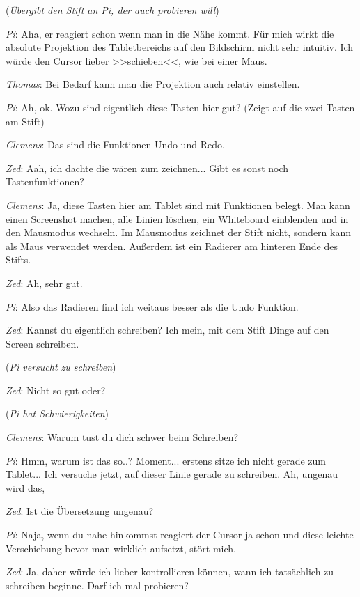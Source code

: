 \medskip (\emph{Übergibt den Stift an Pi, der auch probieren will})

\medskip \emph{Pi}: Aha, er reagiert schon wenn man in die Nähe kommt. Für mich wirkt die absolute Projektion des Tabletbereichs auf den Bildschirm nicht sehr intuitiv. Ich würde den Cursor lieber >>schieben<<, wie bei einer Maus.

\medskip \emph{Thomas}: Bei Bedarf kann man die Projektion auch relativ einstellen.

\medskip \emph{Pi}: Ah, ok. Wozu sind eigentlich diese Tasten hier gut? (Zeigt auf die zwei Tasten am Stift) 

\medskip \emph{Clemens}: Das sind die Funktionen Undo und Redo.

\medskip \emph{Zed}: Aah, ich dachte die wären zum zeichnen... Gibt es sonst noch Tastenfunktionen?

\medskip \emph{Clemens}: Ja, diese Tasten hier am Tablet sind mit Funktionen belegt. Man kann einen Screenshot machen, alle Linien löschen, ein Whiteboard einblenden und in den Mausmodus wechseln. Im Mausmodus zeichnet der Stift nicht, sondern kann als Maus verwendet werden. Außerdem ist ein Radierer am hinteren Ende des Stifts.

\medskip \emph{Zed}: Ah, sehr gut.

\medskip \emph{Pi}: Also das Radieren find ich weitaus besser als die Undo Funktion.

\medskip \emph{Zed}: Kannst du eigentlich schreiben? Ich mein, mit dem Stift Dinge auf den Screen schreiben. 

\medskip (\emph{Pi versucht zu schreiben})

\medskip \emph{Zed}: Nicht so gut oder?

\medskip (\emph{Pi hat Schwierigkeiten})

\medskip \emph{Clemens}: Warum tust du dich schwer beim Schreiben?

\medskip \emph{Pi}: Hmm, warum ist das so..? Moment... erstens sitze ich nicht gerade zum Tablet... Ich versuche jetzt, auf dieser Linie gerade zu schreiben. Ah, ungenau wird das,

\medskip \emph{Zed}: Ist die Übersetzung ungenau?

\medskip \emph{Pi}: Naja, wenn du nahe hinkommst reagiert der Cursor ja schon und diese leichte Verschiebung bevor man wirklich aufsetzt, stört mich. 

\medskip \emph{Zed}: Ja, daher würde ich lieber kontrollieren können, wann ich tatsächlich zu schreiben beginne. Darf ich mal probieren?

